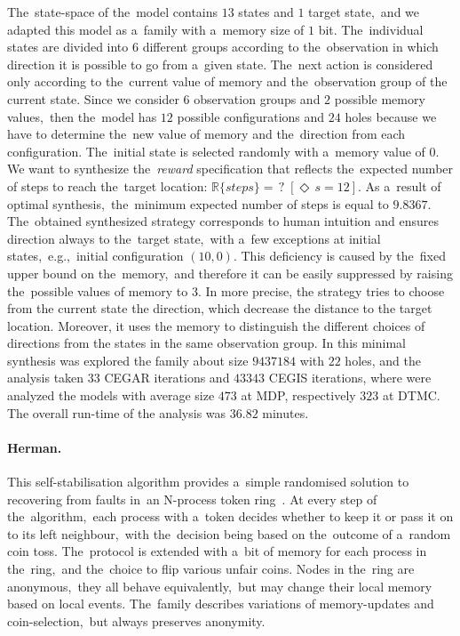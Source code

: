 The~state-space of the~model contains $13$ states and $1$ target state,~and we adapted this model as a~family with a~memory size of $1$ bit.
The~individual states are divided into $6$ different groups according to the~observation in which direction it is possible to go from a~given state.
The~next action is considered only according to the~current value of memory and the~observation group of the current state. 
Since we consider $6$ observation groups and $2$ possible memory values,~then the~model has $12$ possible configurations and $24$ holes because we have to determine the~new value of memory and the~direction from each configuration.
The~initial state is selected randomly with a~memory value of 0.
We want to synthesize the~\textit{reward} specification that reflects the~expected number of steps to reach the~target location: $\mathbb{R}\{steps\} = \, ? \; [\Diamond \, s=12]$.
As a~result of optimal synthesis,~the~minimum expected number of steps is equal to $9.8367$.
The~obtained synthesized strategy corresponds to human intuition and ensures direction always to the~target state,~with a~few exceptions at initial states,~e.g.,~initial configuration $(10, 0)$.
This deficiency is caused by the~fixed upper bound on the~memory,~and therefore it can be easily suppressed by raising the~possible values of memory to $3$.
In more precise, the strategy tries to choose from the current state the direction, which decrease the distance to the target location.
Moreover, it uses the memory to distinguish the different choices of directions from the states in the same observation group.
In this minimal synthesis was explored the family about size $9437184$ with $22$ holes, and the analysis taken $33$ CEGAR iterations and $43343$ CEGIS iterations, where were analyzed the models with average size $473$ at MDP, respectively $323$ at DTMC.
The overall run-time of the analysis was $36.82$ minutes.


\paragraph{Herman.}
This self-stabilisation algorithm provides a~simple randomised solution to recovering from faults in~an N-process token ring~\cite{herman-1,herman-2}.
At every step of the~algorithm,~each process with a~token decides whether to keep it or pass it on to its left neighbour,~with the~decision being based on the~outcome of a~random coin toss.
The~protocol is extended with a~bit of memory for each process in the~ring,~and the~choice to flip various unfair coins.
Nodes in the~ring are anonymous,~they all behave equivalently,~but may change their local memory based on local events.
The~family describes variations of memory-updates and coin-selection,~but always preserves anonymity.

